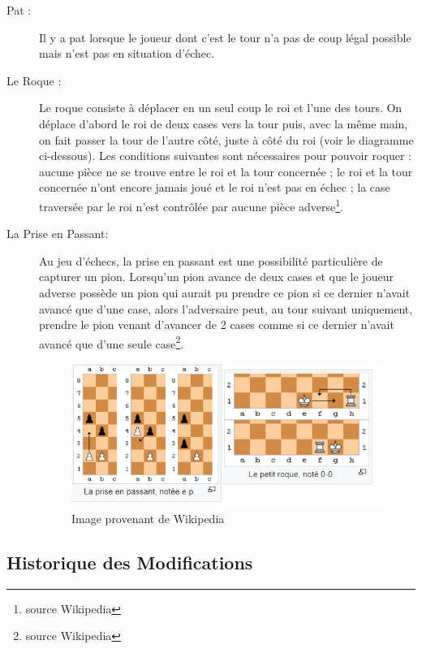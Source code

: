 \documentclass[10pt, a4paper]{article}
\begin{document}
\begin{description}
		\item[Pat :] Il y a pat lorsque le joueur dont c'est le tour n'a pas de coup légal possible mais n'est pas en situation d'échec.
		\item[Le Roque :] Le roque consiste à déplacer en un seul coup le roi et l'une des tours. On déplace d'abord le roi de deux cases vers la tour puis, avec la même main, on fait passer la tour de l'autre côté, juste à côté du roi (voir le diagramme ci-dessous). Les conditions suivantes sont nécessaires pour pouvoir roquer : aucune pièce ne se trouve entre le roi et la tour concernée ; le roi et la tour concernée n'ont encore jamais joué et le roi n'est pas en échec ;
la case traversée par le roi n'est contrôlée par aucune pièce adverse\footnote{source Wikipedia}.
		\item[La Prise en Passant:] Au jeu d’échecs, la prise en passant est une possibilité particulière de capturer un pion. Lorsqu’un pion avance de deux cases et que le joueur adverse possède un pion qui aurait pu prendre ce pion si ce dernier n'avait avancé que d'une case, alors l'adversaire peut, au tour suivant uniquement, prendre le pion venant d'avancer de 2 cases comme si ce dernier n'avait avancé que d'une seule case\footnote{source Wikipedia}.
		\begin{figure}[bh]
		\centering
		\includegraphics[scale=1]{roque_prise_passant.png}
		\caption{Image provenant de Wikipedia}
		\end{figure}

		\end{description}
		\clearpage

		\subsection{Historique des Modifications}
\end{document}

